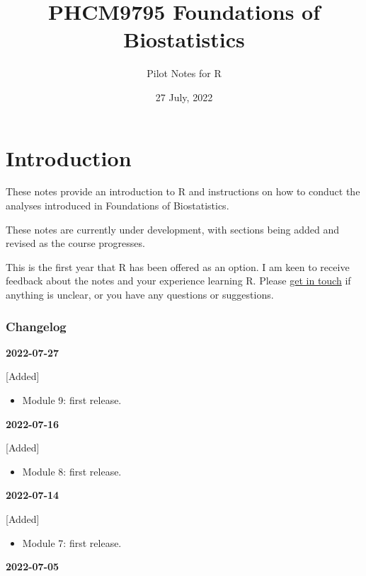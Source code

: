 \documentclass[
]{memoir}
\title{PHCM9795 Foundations of Biostatistics}
\author{Pilot Notes for R}
\date{27 July, 2022}
\providecommand{\tightlist}{%
  \setlength{\itemsep}{0pt}\setlength{\parskip}{0pt}}
\begin{document}
\maketitle

{
\setcounter{tocdepth}{1}
\tableofcontents
}
\hypertarget{introduction}{%
\chapter*{Introduction}\label{introduction}}

These notes provide an introduction to R and instructions on how to conduct the analyses introduced in Foundations of Biostatistics.

These notes are currently under development, with sections being added and revised as the course progresses.

This is the first year that R has been offered as an option. I am keen to receive feedback about the notes and your experience learning R. Please \href{mailto:t.dobbins@unsw.edu.au}{get in touch} if anything is unclear, or you have any questions or suggestions.

\hypertarget{changelog}{%
\subsection*{Changelog}\label{changelog}}

\textbf{2022-07-27}

{[}Added{]}

\begin{itemize}
\tightlist
\item
  Module 9: first release.
\end{itemize}

\textbf{2022-07-16}

{[}Added{]}

\begin{itemize}
\tightlist
\item
  Module 8: first release.
\end{itemize}

\textbf{2022-07-14}

{[}Added{]}

\begin{itemize}
\tightlist
\item
  Module 7: first release.
\end{itemize}

\textbf{2022-07-05}
\end{document}
